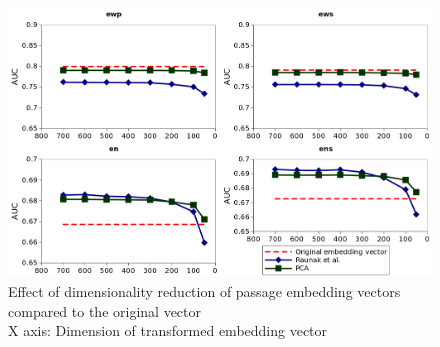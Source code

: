 \begin{figure}[h]
  \centering
  \includegraphics[width=\linewidth]{graphics/emb_vec_dim_red_plot.png}
  \caption{Effect of dimensionality reduction of passage embedding vectors compared to the original vector \\
  X axis: Dimension of transformed embedding vector}
  \label{fig:dimred}
\end{figure}